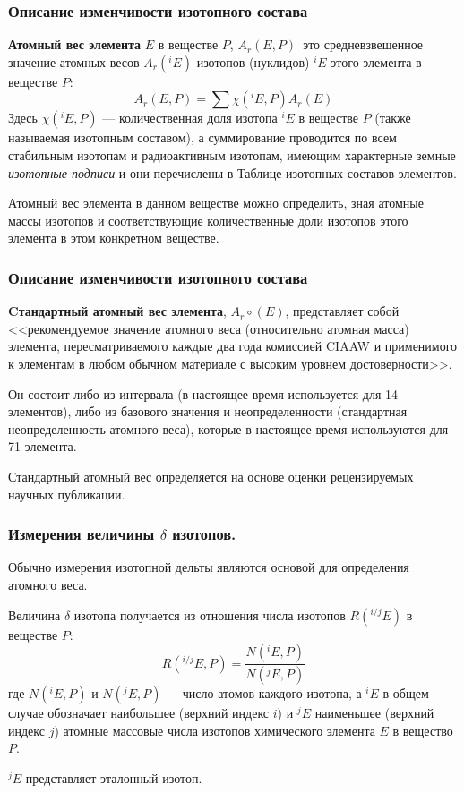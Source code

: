 \begin{frame}
\frametitle{Описание изменчивости изотопного состава}

{\bf Атомный вес элемента} $E$ в веществе $P$, $A_r(E, P)$ это средневзвешенное значение атомных весов
$A_r(^iE)$ изотопов (нуклидов) $^iE$ этого элемента в веществе $P$: 
\begin{equation}  \label{ArEP}
A_r(E, P) = \sum \chi(^iE, P)A_r(E)
\end{equation}
Здесь $\chi(^iE, P)$ — количественная доля изотопа $^iE$ в веществе $P$ (также называемая изотопным составом), 
а суммирование проводится по всем стабильным изотопам и радиоактивным изотопам, имеющим характерные земные \emph{изотопные подписи} и они перечислены в Таблице изотопных составов элементов. 

\medskip
Атомный вес элемента в данном веществе можно определить, зная атомные массы изотопов и соответствующие количественные доли изотопов этого элемента в этом конкретном веществе.

\end{frame}

\begin{frame}
\frametitle{Описание изменчивости изотопного состава}

{\bf Cтандартный атомный вес элемента}, $A_{r}{\circ}(E)$, представляет собой <<рекомендуемое значение атомного веса (относительно атомная масса) элемента, пересматриваемого каждые два года комиссией CIAAW и применимого к элементам в любом обычном материале 
с высоким уровнем достоверности>>. 

\medskip
Он состоит либо из интервала (в настоящее время используется для 14 элементов), либо из базового значения и неопределенности (стандартная неопределенность атомного веса), которые в настоящее время используются для 71 элемента. 

\medskip
Стандартный атомный вес определяется на основе оценки рецензируемых научных
публикации. 
\end{frame}

\begin{frame}
\frametitle{Измерения величины $\delta$ изотопов.}
Обычно измерения изотопной дельты являются основой для определения атомного веса.

\medskip
Величина $\delta$ изотопа получается из отношения числа изотопов $R(^{i/j}E)$ в веществе $P$:
\begin{equation} \label{REP}
R(^{i/j}E, P) =  \frac{N(^iE, P)}{N(^jE, P)}  %
\end{equation}
где $N(^iE, P)$ и $N(^jE, P)$ — число атомов каждого изотопа, а $^iE$ в общем случае обозначает наибольшее
(верхний индекс $i$) и $^jE$ наименьшее (верхний индекс $j$) атомные массовые числа изотопов химического элемента $E$ в вещество $P$.

\medskip
 $^jE$ представляет эталонный изотоп. 

\end{frame}

